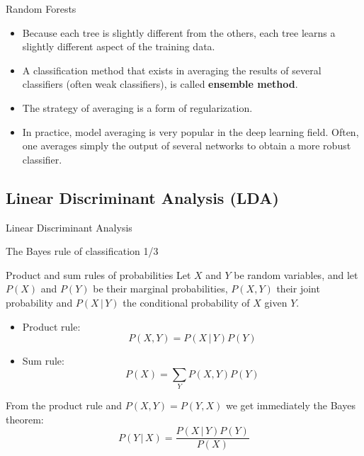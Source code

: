 \documentclass[xcolor=pdftex,dvipsnames,table]{beamer}
\begin{document}
\begin{frame}{Random Forests}
\begin{itemize}
	\item Because each tree is slightly different from the others, each tree learns a slightly different aspect of the training data. 
	\item A classification method that exists in averaging the results of several classifiers (often weak classifiers), is called {\bf ensemble method}. 
	\item The strategy of averaging is a form of regularization. 
	\item In practice, model averaging is very popular in the deep learning field. Often, one averages simply the output of several networks to obtain a more robust classifier.
\end{itemize}	
\end{frame}

\subsection{Linear Discriminant Analysis (LDA)}
\begin{frame}[plain,c]
\begin{center}
\Huge Linear Discriminant Analysis
\end{center}
\end{frame}


\begin{frame}{The Bayes rule of classification 1/3}
\begin{block}{Product and sum rules of probabilities}
	Let $X$ and $Y$ be random variables, and let $P(X)$ and $P(Y)$ be their marginal probabilities, $P(X,Y)$ their joint probability and $P(X\,|\,Y)$ the conditional probability of $X$ given $Y$. 
	\begin{itemize}
		\item Product rule: 
		\begin{equation}
			P(X,Y) = P(X\,|\,Y)P(Y)
		\end{equation}
		\item Sum rule:
		\begin{equation}
			P(X) = \sum_Y P(X,Y)P(Y)
		\end{equation}
	\end{itemize}
\end{block}
From the product rule and $P(X,Y)=P(Y,X)$ we get immediately the Bayes theorem:
\begin{equation}
	P(Y \, | \, X) = \frac{P(X \, | \, Y)P(Y)}{P(X)} 
\end{equation}
\end{frame}
\end{document}

